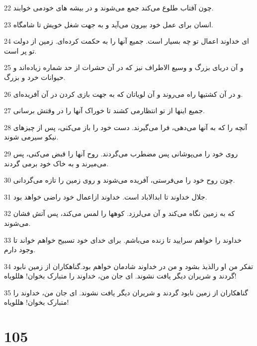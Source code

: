\par 22 چون آفتاب طلوع می‌کند جمع می‌شوند و در بیشه های خودمی خوابند.
\par 23 انسان برای عمل خود بیرون می‌آید و به جهت شغل خویش تا شامگاه.
\par 24 ‌ای خداوند اعمال تو چه بسیار است. جمیع آنها را به حکمت کرده‌ای. زمین از دولت تو پر است.
\par 25 و آن دریای بزرگ و وسیع الاطراف نیز که در آن حشرات از حد شماره زیاده‌اند و حیوانات خرد و بزرگ.
\par 26 و در آن کشتیها راه می‌روند و آن لویاتان که به جهت بازی کردن در آن آفریده‌ای.
\par 27 جمیع اینها از تو انتظارمی کشند تا خوراک آنها را در وقتش برسانی.
\par 28 آنچه را که به آنها می‌دهی، فرا می‌گیرند. دست خود را باز می‌کنی، پس از چیزهای نیکو سیرمی شوند.
\par 29 روی خود را می‌پوشانی پس مضطرب می‌گردند. روح آنها را قبض می‌کنی، پس می‌میرند و به خاک خود برمی گردند.
\par 30 چون روح خود را می‌فرستی، آفریده می‌شوند و روی زمین را تازه می‌گردانی.
\par 31 جلال خداوند تا ابدالاباد است. خداوند ازاعمال خود راضی خواهد بود.
\par 32 که به زمین نگاه می‌کند و آن می‌لرزد. کوهها را لمس می‌کند، پس آتش فشان می‌شوند.
\par 33 خداوند را خواهم سرایید تا زنده می‌باشم. برای خدای خود تسبیح خواهم خواند تا وجود دارم.
\par 34 تفکر من او رالذیذ بشود و من در خداوند شادمان خواهم بود.گناهکاران از زمین نابود گردند و شریران دیگر یافت نشوند. ای جان من، خداوند را متبارک بخوان! هللویاه!
\par 35 گناهکاران از زمین نابود گردند و شریران دیگر یافت نشوند. ای جان من، خداوند را متبارک بخوان! هللویاه!
 
\chapter{105}

